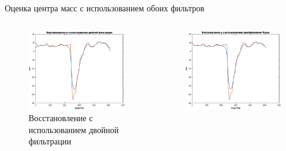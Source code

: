 \documentclass[10pt]{beamer}
\begin{document}





\begin{frame}{Оценка центра масс с использованием обоих фильтров}
	\begin{columns}
		\begin{figure}[h!]
			\centering
			\includegraphics[width=1\linewidth]{restore_eta_double_real.eps}
			\caption{Восстановление с использованием двойной фильтрации}
			\label{restore_double_real}
		\end{figure}
		\begin{figure}[h!]
			\centering
			\includegraphics[width=1\linewidth]{restore_eta_fur_real.eps}

\end{figure}
\end{columns}
\end{frame}
\end{document}
